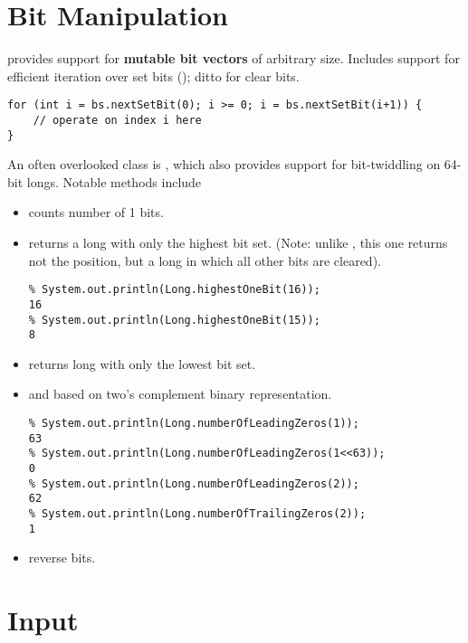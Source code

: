 \section{Bit Manipulation}

\textbf{} provides support for \textbf{mutable bit vectors} of arbitrary size.
Includes support for efficient iteration over set bits (); ditto for clear bits.
\begin{verbatim}
for (int i = bs.nextSetBit(0); i >= 0; i = bs.nextSetBit(i+1)) {
    // operate on index i here
}
\end{verbatim}

\textbf{}
An often overlooked class is , which also provides support for
bit-twiddling on 64-bit longs.  Notable methods include
\begin{itemize}
\item {} counts number of 1 bits.
\item {} returns a long with only the highest bit set. (Note: unlike ,
    this one returns not the position, but a long in which all other bits are cleared).
\begin{verbatim}
% System.out.println(Long.highestOneBit(16));
16
% System.out.println(Long.highestOneBit(15));
8
\end{verbatim}

\item {} returns long with only the lowest bit set.
\item {} and  based on two's complement binary representation.
\begin{verbatim}
% System.out.println(Long.numberOfLeadingZeros(1));
63
% System.out.println(Long.numberOfLeadingZeros(1<<63));
0
% System.out.println(Long.numberOfLeadingZeros(2));
62
% System.out.println(Long.numberOfTrailingZeros(2));
1
\end{verbatim}

\item {} reverse bits.
\end{itemize}

%
\section{Input}

